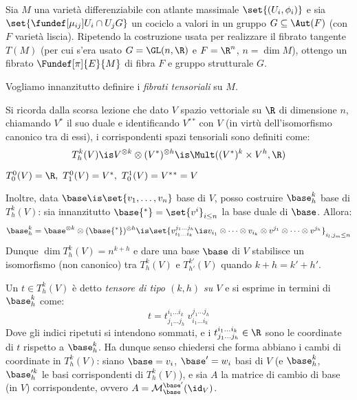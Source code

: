 

\newcommand*\dual{{^\ast}} %


Sia $M$ una varietà differenziabile con atlante massimale $\set{(U_i, \phi_i)}$
e sia $\set{ \fundef[\mu_{ij}]{U_i \cap U_j}{G} }$ un cociclo a valori in un gruppo $G \subseteq \Aut(F)$ (con $F$ varietà liscia). Ripetendo la costruzione usata per realizzare il fibrato tangente $T(M)$ (per cui s'era usato $G = \GL(n, \R)$ e $F=\R^n$, $n = \dim M$), ottengo un fibrato $\Fundef[\pi]{E}{M}$ di fibra $F$ e gruppo strutturale $G$.


Vogliamo innanzitutto definire i \emph{fibrati tensoriali} su $M$.

Si ricorda dalla scorsa lezione che dato $V$ spazio vettoriale su $\R$ di dimensione $n$, chiamando $V\dual$ il suo duale e identificando $V \dual \dual$ con $V$ (in virtù dell'isomorfismo canonico tra di essi), i corrispondenti spazi tensoriali sono definiti come: \[
T_h^k(V) \is V^{\otimes k} \otimes (V \dual)^{\otimes h} \is \Mult( (V\dual)^k \times V^h, \R)  \]
\begin{oss}
	$ T_0^0(V) = \R, \ T_1^0(V) = V \dual, \ T_0^1(V) = V \dual \dual = V $
\end{oss}	
Inoltre, data $\base \is \set{v_1, \dots, v_n}$ base di $V$, posso costruire $\base_h^k$ base di $T_h^k(V)$: sia innanzitutto $\base \dual = \set{v^i}_{i \leq n}$ la base duale di $\base$. Allora: \[
\base_h^k = \base ^{\otimes k} \otimes (\base \dual)^{\otimes h} \is
\set{v^{j_1 \dots j_h}_{i_1 \dots i_k} \is v_{i_1} \otimes \dots \otimes v_{i_k} \otimes v^{j_1} \otimes \dots \otimes v^{j_h} } _{i_l, j_m \leq n} \]
Dunque $\dim T_h^k(V) = n^{k+h}$ e dare una base $\base$ di $V$ stabilisce un isomorfismo (non canonico) tra $T_h^k(V)$ e $T_{h'}^{k'}(V)$ quando $k+h = k'+h'$.

Un $t \in T_h^k(V)$ è detto \emph{tensore di tipo $(k, h)$ su $V$} e si esprime in termini di $\base_h^k$ come: \[
t = t_{j_1 \dots j_h}^{i_1 \dots i_k} \  v^{j_1 \dots j_h}_{i_1 \dots i_k} \]
Dove gli indici ripetuti si intendono sommati, e i $t_{j_1 \dots j_h}^{i_1 \dots i_k} \in \R$ sono le coordinate di $t$ rispetto a $\base_h^k$. Ha dunque senso chiedersi che forma abbiano i cambi di coordinate in $T^k_h(V)$: siano $\base={v_i}$, $\base'={w_i}$ basi di $V$ (e $\base_h^k$, $\base_h^{\prime k}$ le basi corrispondenti di $T^k_h(V)$), e sia $A$ la matrice di cambio di base (in $V$) corrispondente, ovvero $A = \mathcal{M}_{\base}^{\base'}(\id_V)$.

